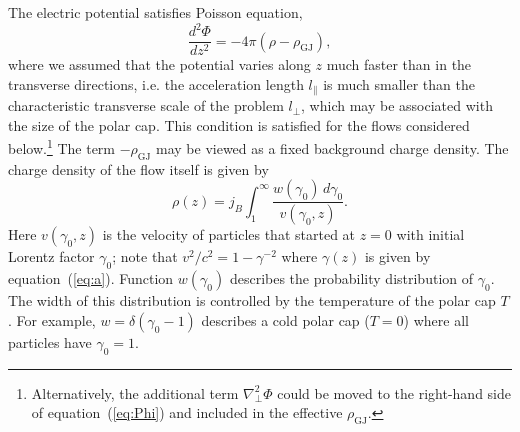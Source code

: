 The electric potential satisfies Poisson equation,
\begin{equation}
\label{eq:Phi}
    \frac{d^2\Phi}{dz^2}=-4\pi(\rho-\rho_\mathrm{GJ}),
\end{equation}
where we assumed that the potential varies along $z$ much faster than in
the transverse directions, i.e. the acceleration length $l_\parallel$ is much smaller
than the characteristic transverse scale of the problem $l_\perp$, which may be
associated with the size of the polar cap. This condition is satisfied for the flows considered below.\footnote{
      Alternatively, the additional term $\nabla_\perp^2\Phi$ could be moved to the
      right-hand side of equation~(\ref{eq:Phi}) and included in the effective $\rho_\mathrm{GJ}$.}
The term $-\rho_\mathrm{GJ}$ may be viewed as a fixed background charge density.
The charge density of the flow itself is given by
\begin{equation}
     \rho(z)=j_B \int_1^{\infty} \frac{w(\gamma_0)\,d\gamma_0}{v(\gamma_0,z)}.
\end{equation}
Here $v(\gamma_0,z)$ is the velocity of particles that started at $z=0$
with initial Lorentz factor $\gamma_0$; note that $v^2/c^2=1-\gamma^{-2}$ where
$\gamma(z)$ is given by equation~(\ref{eq:a}).
Function $w(\gamma_0)$ describes the probability distribution of $\gamma_0$.
The width of this distribution is controlled by the temperature of the polar cap $T$.
For example, $w=\delta(\gamma_0-1)$ describes a cold polar cap ($T=0$) where
all particles have $\gamma_0=1$.

